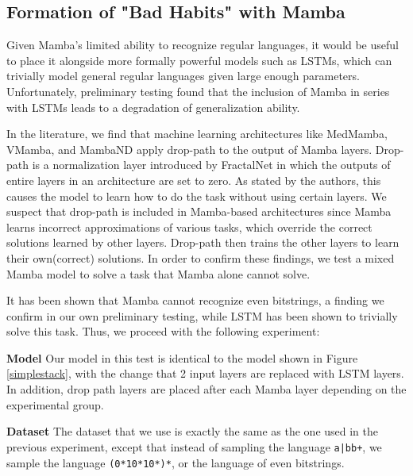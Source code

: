 \subsection{Formation of "Bad Habits" with Mamba}
Given Mamba's limited ability to recognize regular languages, it would be useful
to place it alongside more formally powerful models such as LSTMs, which can
trivially model general regular languages given large enough
parameters\cite{lstmformal}. Unfortunately, preliminary testing found that the
inclusion of Mamba in series with LSTMs leads to a degradation of generalization
ability.

In the literature, we find that machine learning architectures like
MedMamba\cite{medmamba}, VMamba\cite{vmamba}, and MambaND\cite{mamband} apply
drop-path to the output of Mamba layers.
Drop-path is a normalization layer introduced by FractalNet\cite{fractalnet} in
which the outputs of entire layers in an architecture are set to zero.
As stated by the authors, this causes the model to learn how to do the task
without using certain layers.
We suspect that drop-path is included in Mamba-based architectures since Mamba
learns incorrect approximations of various tasks, which override the correct
solutions learned by other layers.
Drop-path then trains the other layers to learn their own(correct) solutions.
In order to confirm these findings, we test a mixed Mamba model to solve a task
that Mamba alone cannot solve.

It has been shown that Mamba cannot recognize even bitstrings\cite{ssmformal},
a finding we confirm in our own preliminary testing, while LSTM has been shown
to trivially solve this task. Thus, we proceed with the following experiment:

\textbf{Model} Our model in this test is identical to the model shown in
Figure \ref{simplestack}, with the change that 2 input layers are replaced with
LSTM layers.
In addition, drop path layers are placed after each Mamba layer depending on
the experimental group.

\textbf{Dataset}
The dataset that we use is exactly the same as the one used in the previous
experiment, except that instead of sampling the language \texttt{a|bb+},
we sample the language \texttt{(0*10*10*)*}, or the language of even bitstrings.

